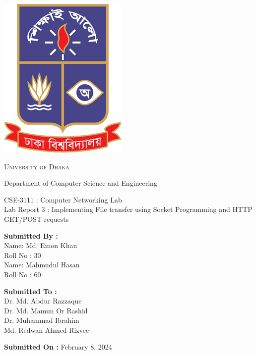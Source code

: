 \documentclass[11pt]{article}
\begin{document}
\begin{titlepage}
    \begin{center}
        \includegraphics[scale=0.35]{du_logo.png}\par
        \begin{Huge}
            \textsc{University of Dhaka}\par
        \end{Huge}
        \begin{Large}
            Department of Computer Science and Engineering\par \vspace{1cm}
            CSE-3111 : Computer Networking Lab \\[12pt]    
            Lab Report 3 : Implementing File transfer using Socket Programming and HTTP GET/POST requests
        \end{Large}
    \end{center}
    
    \vfill
    
    \begin{large}
        \begin{multicols}{2}
            \noindent
            \textbf{Submitted By :\\[12pt]}
                Name: Md. Emon Khan\\[8pt]
                Roll No : 30\\[12pt]
                Name: Mahmudul Hasan\\[8pt]
                Roll No : 60\\[12pt]
                
            \columnbreak
            
            \noindent
            \textbf{Submitted To :\\[12pt]}
                Dr. Md. Abdur Razzaque\\[12pt]
                Dr. Md. Mamun Or Rashid\\[12pt]
                Dr. Muhammad Ibrahim\\[12pt]
                Md. Redwan Ahmed Rizvee
        \end{multicols}    
    \end{large} 
    
\textbf{Submitted On :} February 8, 2024\\[20pt]

\end{titlepage}
\tableofcontents
\newpage
\end{document}
